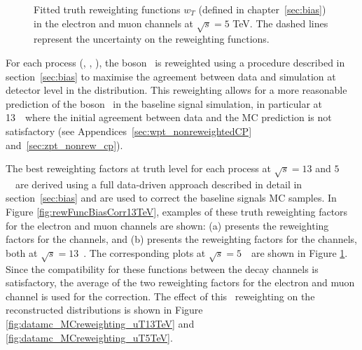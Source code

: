 \begin{figure}[h]
  \centering
  \caption{Fitted truth reweighting functions $w_{T}$ (defined in chapter~\ref{sec:bias}) in the electron and muon channels at $\sqrt{s}=5$ TeV. The dashed lines represent the uncertainty on the reweighting functions.}
  \label{fig:rewFuncBiasCorr5TeV}
\end{figure}

For each process (\Wplus, \Wminus, \Zboson), the boson \pt\ is reweighted using a procedure described in section~\ref{sec:bias} to maximise the agreement between data and simulation at detector level in the \ut distribution.
This reweighting allows for a more reasonable prediction of the boson \pt\ in the baseline signal simulation, in particular at 13~\TeV\ where the initial agreement between data and the MC prediction is not satisfactory (see Appendices~\ref{sec:wpt_nonreweightedCP} and~\ref{sec:zpt_nonrew_cp}).

The best reweighting factors at truth level for each process at $\sqrt{s} = 13$ and $5$~\TeV\ are derived using a full data-driven approach described in detail in section~\ref{sec:bias} and are used to correct the baseline \POWHEG signals MC samples.
In Figure \ref{fig:rewFuncBiasCorr13TeV}, examples of these truth reweighting factors for the electron and muon channels are shown: (a) presents the reweighting factors for the \Wminus channels, and (b) presents the reweighting factors for the \Wplus channels, both at $\sqrt{s} = 13$~\TeV. The corresponding plots at $\sqrt{s} = 5$~\TeV\ are shown in Figure \ref{fig:rewFuncBiasCorr5TeV}. Since the compatibility for these functions between the decay channels is satisfactory, the average of the two reweighting factors for the electron and muon channel is used for the correction.
The effect of this \pt\ reweighting on the reconstructed \ut distributions is shown in Figure \ref{fig:datamc_MCreweighting_uT13TeV} and \ref{fig:datamc_MCreweighting_uT5TeV}.

